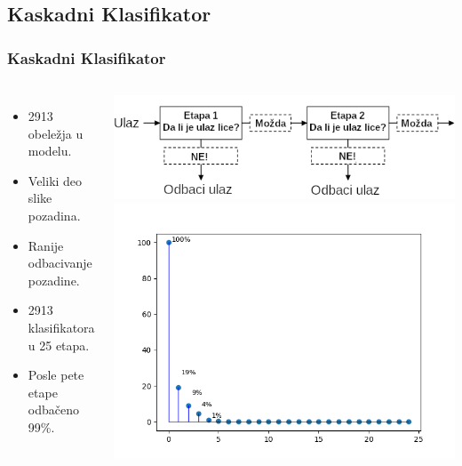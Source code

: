 \documentclass{beamer}
\begin{document}
\subsection{Kaskadni Klasifikator}
\begin{frame}
  \frametitle{Kaskadni Klasifikator}

  \begin{columns}[onlytextwidth,T]
    \column{\dimexpr\linewidth-60mm-2mm}
  \begin{itemize}
  \item<1-> 2913 obeležja u modelu.
  \item<1-> Veliki deo slike pozadina.
  \item<1-> Ranije odbacivanje pozadine.
  \item<1-> 2913 klasifikatora u 25 etapa.
  \item<2-> Posle pete etape odbačeno 99\%.
  \end{itemize}


  \column{80mm}
  \begin{overprint}
    \includegraphics[width=0.9\linewidth]{../images/cascade_classifier1}
    \includegraphics[width=0.9\linewidth]{../images/cascade_classifier2}
  \end{overprint}

  \end{columns}
\end{frame}
\end{document}

